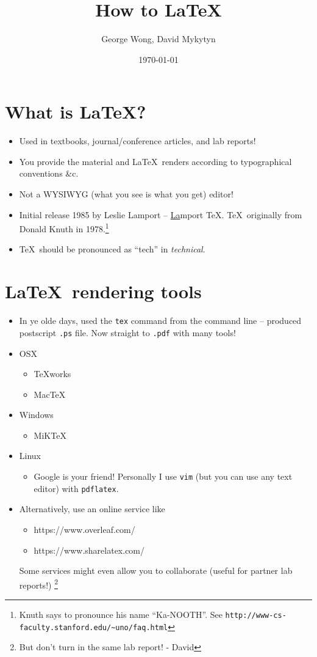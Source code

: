 \documentclass[12pt]{article}
\begin{document}
\title{\vspace{-5em}How to \LaTeX}
\author{George Wong, David Mykytyn}
\date{\properdate\today}
\maketitle

\vspace{1em}

\section{What is \LaTeX?}
\begin{itemize}
\item Used in textbooks, journal/conference articles, and lab reports!
\item You provide the material and \LaTeX\ renders according to typographical conventions \&c.
\item Not a WYSIWYG (what you see is what you get) editor!
\item Initial release 1985 by Leslie Lamport -- \underline{La}mport \TeX. \TeX\ originally from Donald Knuth in 1978.\footnote{Knuth says to pronounce his name ``Ka-NOOTH''. See {\tt{}http://www-cs-faculty.stanford.edu/\textasciitilde{}uno/faq.html}}
\item \TeX\ should be pronounced as ``tech'' in \emph{technical}. %
\end{itemize}

\section{\LaTeX\ rendering tools}
\begin{itemize}
\item In ye olde days, used the {\tt tex} command from the command line -- produced postscript {\tt .ps} file. Now straight to {\tt .pdf} with many tools!
\item OSX
\begin{itemize}
\item TeXworks
\item MacTeX
\end{itemize}
\item Windows
\begin{itemize}
\item MiKTeX
\end{itemize}
\item Linux
\begin{itemize}
\item Google is your friend! Personally I use {\tt vim} (but you can use any text editor) with {\tt pdflatex}.
\end{itemize}
\item Alternatively, use an online service like
\begin{itemize}
\item https://www.overleaf.com/
\item https://www.sharelatex.com/
\end{itemize}
Some services might even allow you to collaborate (useful for partner lab reports!) \footnote{But don't turn in the same lab report! - David}
\end{itemize}
\end{document}
